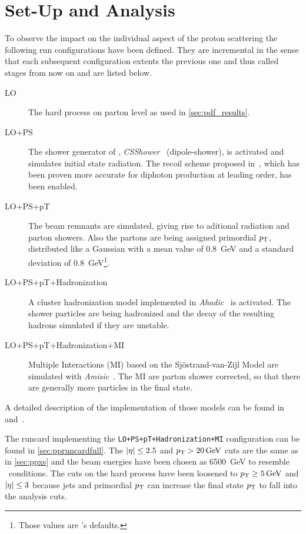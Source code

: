 \section{Set-Up and Analysis}%
\label{sec:setupan}

To observe the impact on the individual aspect of the proton
scattering the following run configurations have been defined. They
are incremental in the sense that each subsequent configuration
extents the previous one and thus called stages from now on and are
listed below.
%
\begin{description}
\item[LO] The hard process on parton level as used in \cref{sec:pdf_results}.
\item[LO+PS] The shower generator of \sherpa,
  \emph{CSShower}~\cite{schumann2008:ap} (dipole-shower), is activated and
  simulates initial state radiation. The recoil scheme proposed
  in~\cite{hoeche2009:ha}, which has been proven more accurate for
  diphoton production at leading order, has been enabled.
\item[LO+PS+pT] The beam remnants are simulated, giving rise to
  aditional radiation and parton showers.  Also the partons are being
  assigned primordial \(p_\mathrm{T}\), distributed like a Gaussian with a mean
  value of \SI{.8}{\giga\electronvolt} and a standard deviation of
  \SI{.8}{\giga\electronvolt}\footnote{Those values are \sherpa 's
    defaults.}.
\item[LO+PS+pT+Hadronization] A cluster hadronization model
  implemented in \emph{Ahadic}~\cite{Winter2003:tt} is
  activated. The shower particles are being hadronized and the decay
  of the resulting hadrons simulated if they are unstable.
\item[LO+PS+pT+Hadronization+MI] Multiple Interactions (MI) based on
  the Sj\"ostrand-van-Zijl Model are simulated with
  \emph{Amisic}~\cite{Bothmann:2019yzt}. The MI are parton shower
  corrected, so that there are generally more particles in the final
  state.
\end{description}
%
A detailed description of the implementation of those models can be
found in~\cite{Gleisberg:2008ta} and~\cite{Bothmann:2019yzt}.

The runcard implementing the \texttt{LO+PS+pT+Hadronization+MI}
configuration can be found in \cref{sec:ppruncardfull}. The
\(\abs{\eta}\leq 2.5\) and \(p_\mathrm{T} > \SI{20}{\giga\electronvolt}\) cuts
are the same as in \cref{sec:ppxs} and the beam energies have been
chosen as \SI{6500}{\giga\electronvolt} to resemble \lhc\ conditions.
The cuts on the hard process have been loosened to
\(p_\mathrm{T} \geq \SI{5}{\giga\electronvolt}\) and \(\abs{\eta}\leq 3\)
because jets and primordial \(p_\mathrm{T}\) can increase the final state
\(p_\mathrm{T}\) to fall into the analysis cuts.

